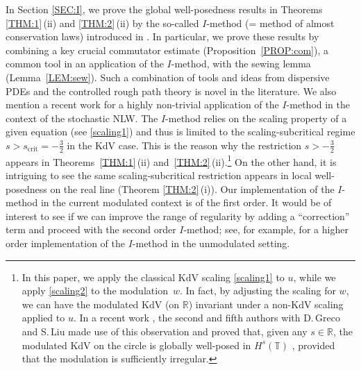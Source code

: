 \documentclass[letterpaper, 11pt,  reqno]{amsart}
\newcommand{\1}{\hspace{0.5mm}\text{I}\hspace{0.5mm}}
\newcommand{\R}{\mathbb{R}}
\newcommand{\T}{\mathbb{T}}
\numberwithin{equation}{section}
\numberwithin{theorem}{section}
\begin{document}
In Section \ref{SEC:I}, we prove the global well-posedness results
in Theorems \ref{THM:1}\,(ii) and \ref{THM:2}\,(ii)
by the so-called $I$-method (= method of almost conservation laws)
introduced in \cite{CKSTT03}.
In particular, we prove these results
by 
combining a key crucial commutator estimate (Proposition~\ref{PROP:com}), 
a common  tool in an application 
of the $I$-method, with the sewing lemma (Lemma~\ref{LEM:sew}).
Such a combination of tools and ideas from dispersive PDEs and the controlled rough path theory is novel in the literature.
We also mention a recent work \cite{GKOT}
for 
a highly non-trivial application of 
the $I$-method in the context of the stochastic NLW.
The $I$-method relies on the scaling property
of a given equation (see \eqref{scaling1}) and thus is limited to the scaling-subcritical regime
$s > s_\text{crit} = -\frac 32$ in the KdV case.
This is the reason why the restriction $s > -\frac 32$ appears in Theorems~\ref{THM:1}\,(ii)
and~\ref{THM:2}\,(ii).\footnote{In this paper, 
we apply the classical KdV scaling 
\eqref{scaling1} to $u$, while we apply  \eqref{scaling2}
to the modulation~$w$.
In fact, by adjusting the scaling for $w$, 
we can have 
the modulated KdV (on $\R$) invariant under
a non-KdV scaling  applied to  $u$.
In a recent work \cite{GGLO}, 
the second and fifth
authors with D.\,Greco and S.\,Liu
made use of this observation and 
proved  that, given  any $s \in \R$, 
the modulated KdV on the circle is 
globally  well-posed
in $H^s(\T)$ , provided that the modulation
is sufficiently irregular.

%
}
On the other hand, it is 
intriguing to see the same scaling-subcritical restriction appears
in  local well-posedness on the real line (Theorem \ref{THM:2}\,(i)).
Our implementation of the $I$-method in the current modulated context is of the first order.
It would be of interest to see if we can improve the range of regularity
by adding a ``correction'' term
and proceed with the second order $I$-method;
see, for example,  \cite{CKSTT03} for a higher order implementation of the $I$-method
in the unmodulated setting.
\end{document}
